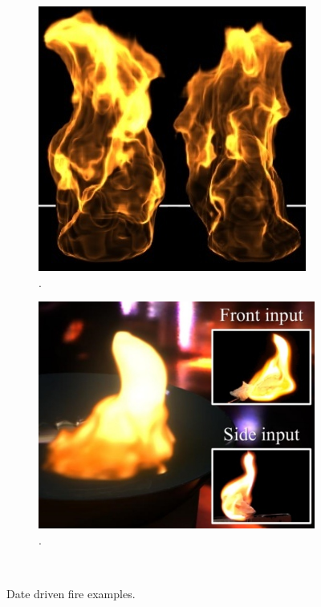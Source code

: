 \begin{figure}[htpb!]
\begin{subfigure}[t]{0.29\textwidth}
                \includegraphics[width=\textwidth]{img/zhang_2011}
                \caption{\cite{Zhang:2011}.}
        \end{subfigure}     
        \begin{subfigure}[t]{0.33\textwidth}
                \includegraphics[width=\textwidth]{img/okabe_2015}
                \caption{\cite{Okabe:2015}.}
        \end{subfigure}%
        ~ %
        \caption{Date driven fire examples.}
        \label{fig:data_driven}
\end{figure}

